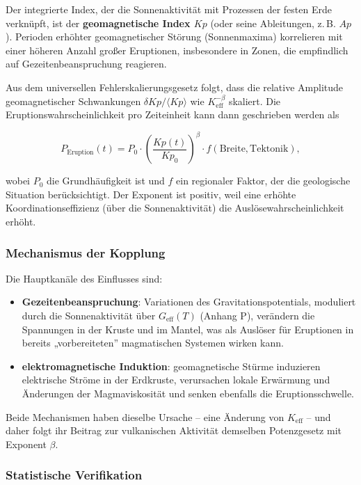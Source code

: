 \documentclass[12pt,a4paper]{article}
\newcommand{\Keff}{K_{\mathrm{eff}}}
\begin{document}
	Der integrierte Index, der die Sonnenaktivität mit Prozessen der festen Erde verknüpft, ist der \textbf{geomagnetische Index \(Kp\)} (oder seine Ableitungen, z. B. \(Ap\)). Perioden erhöhter geomagnetischer Störung (Sonnenmaxima) korrelieren mit einer höheren Anzahl großer Eruptionen, insbesondere in Zonen, die empfindlich auf Gezeitenbeanspruchung reagieren.
	
	Aus dem universellen Fehlerskalierungsgesetz folgt, dass die relative Amplitude geomagnetischer Schwankungen \(\delta Kp / \langle Kp \rangle\) wie \(\Keff^{-\beta}\) skaliert. Die Eruptionswahrscheinlichkeit pro Zeiteinheit kann dann geschrieben werden als
	
	\[
	P_{\text{Eruption}}(t) = P_0 \cdot \left( \frac{Kp(t)}{Kp_0} \right)^{\beta} \cdot f(\text{Breite}, \text{Tektonik}),
	\]
	
	wobei \(P_0\) die Grundhäufigkeit ist und \(f\) ein regionaler Faktor, der die geologische Situation berücksichtigt. Der Exponent ist positiv, weil eine erhöhte Koordinationseffizienz (über die Sonnenaktivität) die Auslösewahrscheinlichkeit erhöht.
	
	\subsubsection{Mechanismus der Kopplung}
	
	Die Hauptkanäle des Einflusses sind:
	\begin{itemize}
		\item \textbf{Gezeitenbeanspruchung}: Variationen des Gravitationspotentials, moduliert durch die Sonnenaktivität über \(G_{\text{eff}}(T)\) (Anhang P), verändern die Spannungen in der Kruste und im Mantel, was als Auslöser für Eruptionen in bereits „vorbereiteten” magmatischen Systemen wirken kann.
		\item \textbf{elektromagnetische Induktion}: geomagnetische Stürme induzieren elektrische Ströme in der Erdkruste, verursachen lokale Erwärmung und Änderungen der Magmaviskosität und senken ebenfalls die Eruptionsschwelle.
	\end{itemize}
	Beide Mechanismen haben dieselbe Ursache – eine Änderung von \(\Keff\) – und daher folgt ihr Beitrag zur vulkanischen Aktivität demselben Potenzgesetz mit Exponent \(\beta\).
	
	\subsubsection{Statistische Verifikation}
	
\end{document}
